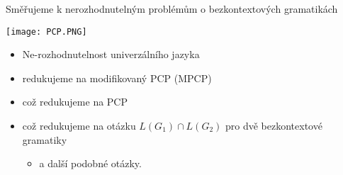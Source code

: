     
    
    
    \begin{frame}{Směřujeme k nerozhodnutelným problémům o bezkontextových gramatikách}
    
    \texttt{[image: PCP.PNG]}
    \begin{itemize}
        \item Ne-rozhodnutelnost univerzálního jazyka
     \item redukujeme na modifikovaný PCP (MPCP)
     \item což redukujeme na PCP
     \item což redukujeme na otázku $L(G_1)\cap L(G_2)$ pro dvě bezkontextové gramatiky
     \begin{itemize}\item a další podobné otázky.
    \end{itemize}
    \end{itemize}
    \end{frame}
    
    
    
